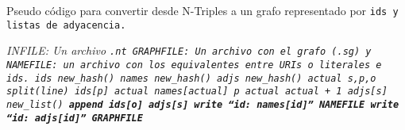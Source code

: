 \begin{algorithm}
  \caption{Pseudo código para convertir desde N-Triples a un grafo
  representado por \tt{id}s y listas de adyacencia.}\label{alg:convert}
  \begin{algorithmic}[1]
    \Require \it{INFILE}: Un archivo \tt{.nt}
    \Ensure \it{GRAPHFILE}: Un archivo con el grafo (\tt{.sg}) y
            \it{NAMEFILE}: un archivo con los equivalentes entre URIs o 
            literales e \tt{id}s.
    \State \it{ids} \get \it{new\_hash}()
    \State \it{names} \get \it{new\_hash}()
    \State \it{adjs} \get \it{new\_hash}()
    \State \it{actual} 
      \State \it{s,p,o} \get \it{split}(\it{line})
          \State \it{ids}[\it{p}] \get \it{actual}
          \State \it{names}[\it{actual}] \get \it{p}
          \State \it{actual} \get \it{actual} + 1
        \EndIf
      \EndFor
        \State \it{adjs}[\it{s}] \get \it{new\_list}()
      \EndIf
      \State \bf{append} \it{ids}[\it{o}] \ra \it{adjs}[\it{s}]
    \EndFor
      \State \bf{write} ``\it{id}: \it{names}[\it{id}]'' \ra \it{NAMEFILE}
      \State \bf{write} ``\it{id}: \it{adjs}[\it{id}]'' \ra \it{GRAPHFILE}
    \EndFor
  \end{algorithmic}
\end{algorithm}
